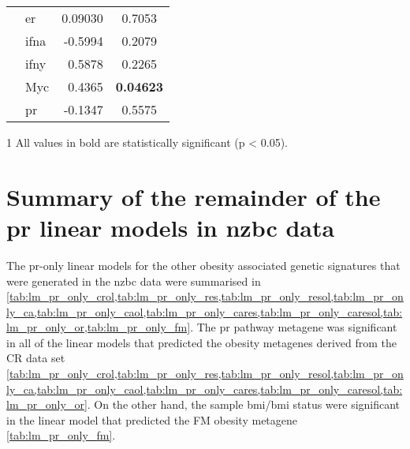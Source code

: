 \begin{table}[htpb]
\begin{threeparttable}
\begin{tabular}{llrc}
                                                                           & \gls{er}   & 0.09030  & 0.7053 \\
                                                                           & \gls{ifna} & -0.5994  & 0.2079 \\
                                                                           & \gls{ifny} & 0.5878   & 0.2265 \\
                                                                           & Myc        & 0.4365   & \bfseries{0.04623} \\
                                                                           & \gls{pr}   & -0.1347  & 0.5575 \\
				\hline
				\hline
			\end{tabular}
			\begin{tablenotes}
				\begin{footnotesize}
				\item [1] All values in bold are statistically significant (p \textless{} 0.05).
				\end{footnotesize}
			\end{tablenotes}
		\end{threeparttable}
	\end{table}

	\newpage

	\section{Summary of the remainder of the \gls{pr} linear models in \gls{nzbc} data}
	\label{sec:summary_of_the_pr_linear_models_in_nzbc_data}

	The \gls{pr}-only linear models for the other obesity associated genetic signatures that were generated in the \gls{nzbc} data were summarised in \cref{tab:lm_pr_only_crol,tab:lm_pr_only_res,tab:lm_pr_only_resol,tab:lm_pr_only_ca,tab:lm_pr_only_caol,tab:lm_pr_only_cares,tab:lm_pr_only_caresol,tab:lm_pr_only_or,tab:lm_pr_only_fm}.
	The \gls{pr} pathway metagene was significant in all of the linear models that predicted the obesity metagenes derived from the CR data set \cref{tab:lm_pr_only_crol,tab:lm_pr_only_res,tab:lm_pr_only_resol,tab:lm_pr_only_ca,tab:lm_pr_only_caol,tab:lm_pr_only_cares,tab:lm_pr_only_caresol,tab:lm_pr_only_or}.
	On the other hand, the sample \gls{bmi}/\gls{bmi} status were significant in the linear model that predicted the FM obesity metagene \cref{tab:lm_pr_only_fm}.

